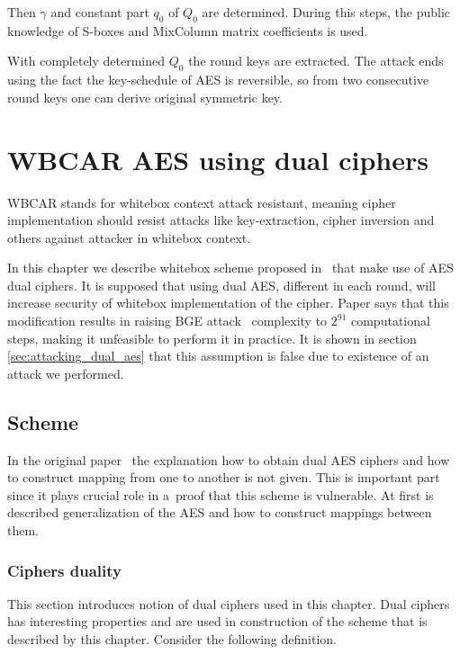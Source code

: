 \documentclass[11pt,oneside,final]{fithesis2}
\begin{document}
    Then $\gamma$ and constant part $q_0$ of $Q_0$ are determined. During this steps, the public knowledge of S-boxes and MixColumn matrix coefficients is used.
    
    With completely determined $Q_0$ the round keys are extracted.
    The attack ends using the fact the key-schedule of AES is reversible, so from two consecutive round keys one can derive original symmetric key.
    
\chapter{WBCAR AES using dual ciphers}\label{sec:wb_dual_aes_sec}
    WBCAR stands for whitebox context attack resistant, meaning cipher implementation should resist attacks like key-extraction, cipher inversion
    and others against attacker in whitebox context.
    
    In this chapter we describe whitebox scheme proposed in~\citep{Karroumi:2010:PWA:2041036.2041060} that make use of AES dual ciphers. It is supposed 
    that using dual AES, different in each round, will increase security of whitebox implementation of the cipher. Paper says that this modification
    results in raising BGE attack~\citep{Billet:2004:CWB:2080787.2080809} complexity to $2^{91}$ computational steps, making it unfeasible to perform it in practice. It is shown in section
    \ref{sec:attacking_dual_aes} that this assumption is false due to existence of an attack we performed.
    
    
    \section{Scheme}

    In the original paper~\citep{Karroumi:2010:PWA:2041036.2041060} the explanation how to obtain dual AES ciphers and how to construct mapping from one 
    to another is not given. This is
    important part since it plays crucial role in a~proof that this scheme is vulnerable. At first is described generalization of the AES and how to construct
    mappings between them. 

	\subsection{Ciphers duality}
	This section introduces notion of dual ciphers used in this chapter. Dual ciphers has interesting properties and are used in construction
	of the scheme that is described by this chapter. Consider the following definition.
	
\end{document}
